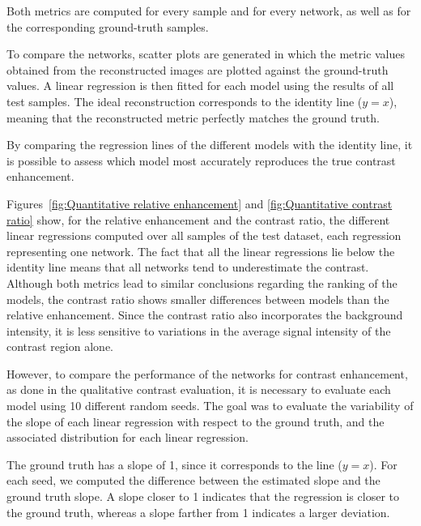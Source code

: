 \documentclass[12pt]{article}
\begin{document}
Both metrics are computed for every sample and for every network, as well as for the corresponding ground-truth samples.
\vspace{0.5cm}

To compare the networks, scatter plots are generated in which the metric values obtained from the reconstructed images are plotted against the ground-truth values.
A linear regression is then fitted for each model using the results of all test samples.
The ideal reconstruction corresponds to the identity line ($y=x$), meaning that the reconstructed metric perfectly matches the ground truth.
\vspace{0.5cm}

By comparing the regression lines of the different models with the identity line, it is possible to assess which model most accurately reproduces the true contrast enhancement.
\vspace{0.5cm}

Figures~\ref{fig:Quantitative relative enhancement} and \ref{fig:Quantitative contrast ratio} show, for the relative enhancement and the contrast ratio, the different linear regressions computed over all samples of the test dataset, each regression representing one network.
The fact that all the linear regressions lie below the identity line means that all networks tend to underestimate the contrast.
Although both metrics lead to similar conclusions regarding the ranking of the models, the contrast ratio shows smaller differences between models than the relative enhancement. 
Since the contrast ratio also incorporates the background intensity, it is less sensitive to variations in the average signal intensity of the contrast region alone.
\vspace{0.5cm}

However, to compare the performance of the networks for contrast enhancement, as done in the qualitative contrast evaluation, it is necessary to evaluate each model using 10 different random seeds.
The goal was to evaluate the variability of the slope of each linear regression with respect to the ground truth, and the associated distribution for each linear regression.
\vspace{0.5cm}

The ground truth has a slope of 1, since it corresponds to the line ($y=x$).
For each seed, we computed the difference between the estimated slope and the ground truth slope.
A slope closer to 1 indicates that the regression is closer to the ground truth, whereas a slope farther from 1 indicates a larger deviation.
\vspace{0.5cm}
\end{document}
